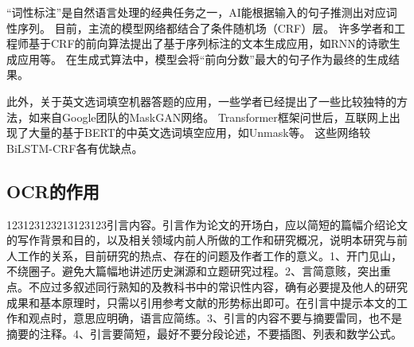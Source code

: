 “词性标注”是自然语言处理的经典任务之一，AI能根据输入的句子推测出对应词性序列。
目前，主流的模型网络都结合了条件随机场（CRF）层。
许多学者和工程师基于CRF的前向算法提出了基于序列标注的文本生成应用，如RNN的诗歌生成应用等。
在生成式算法中，模型会将“前向分数”最大的句子作为最终的生成结果。

此外，关于英文选词填空机器答题的应用，一些学者已经提出了一些比较独特的方法，如来自Google团队的MaskGAN网络。
Transformer框架问世后，互联网上出现了大量的基于BERT的中英文选词填空应用，如Unmask等。
这些网络较BiLSTM-CRF各有优缺点。
\subsection{OCR的作用}
123123123213123123引言内容。引言作为论文的开场白，应以简短的篇幅介绍论文的写作背景和目的，以及相关领域内前人所做的工作和研究概况，说明本研究与前人工作的关系，目前研究的热点、存在的问题及作者工作的意义。1、开门见山，不绕圈子。避免大篇幅地讲述历史渊源和立题研究过程。2、言简意赅，突出重点。不应过多叙述同行熟知的及教科书中的常识性内容，确有必要提及他人的研究成果和基本原理时，只需以引用参考文献的形势标出即可。在引言中提示本文的工作和观点时，意思应明确，语言应简练。3、引言的内容不要与摘要雷同，也不是摘要的注释。4、引言要简短，最好不要分段论述，不要插图、列表和数学公式。